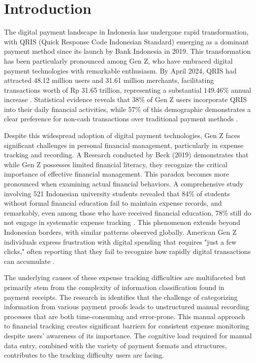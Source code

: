\section{Introduction}

The digital payment landscape in Indonesia has undergone rapid transformation, with QRIS (Quick Response Code Indonesian Standard) emerging as a dominant payment method since its launch by Bank Indonesia in 2019. This transformation has been particularly pronounced among Gen Z, who have embraced digital payment technologies with remarkable enthusiasm. By April 2024, QRIS had attracted 48.12 million users and 31.61 million merchants, facilitating transactions worth of Rp 31.65 trillion, representing a substantial 149.46\% annual increase \cite{CNNqris2024, Tempo2024BIQRIS}. Statistical evidence reveals that 38\% of Gen Z users incorporate QRIS into their daily financial activities, while 57\% of this demographic demonstrates a clear preference for non-cash transactions over traditional payment methods \cite{qris2023goodstats, jawapos2024qris}.

Despite this widespread adoption of digital payment technologies, Gen Z faces significant challenges in personal financial management, particularly in expense tracking and recording. A Research conducted by Beck (2019) \cite{beck2019managing} demonstrates that while Gen Z possesses limited financial literacy, they recognize the critical importance of effective financial management. This paradox becomes more pronounced when examining actual financial behaviors. A comprehensive study involving 521 Indonesian university students revealed that 84\% of students without formal financial education fail to maintain expense records, and remarkably, even among those who have received financial education, 78\% still do not engage in systematic expense tracking \cite{johan2021effect}. This phenomenon extends beyond Indonesian borders, with similar patterns observed globally. American Gen Z individuals express frustration with digital spending that requires "just a few clicks," often reporting that they fail to recognize how rapidly digital transactions can accumulate \cite{lewis2019follow}.

The underlying causes of these expense tracking difficulties are multifaceted but primarily stem from the complexity of information classification found in payment receipts. The research in \cite{kaye2014money} identifies that the challenge of categorizing information from various payment proofs leads to unstructured manual recording processes that are both time-consuming and error-prone. This manual approach to financial tracking creates significant barriers for consistent expense monitoring despite users' awareness of its importance. The cognitive load required for manual data entry, combined with the variety of payment formats and structures, contributes to the tracking difficulty users are facing.

